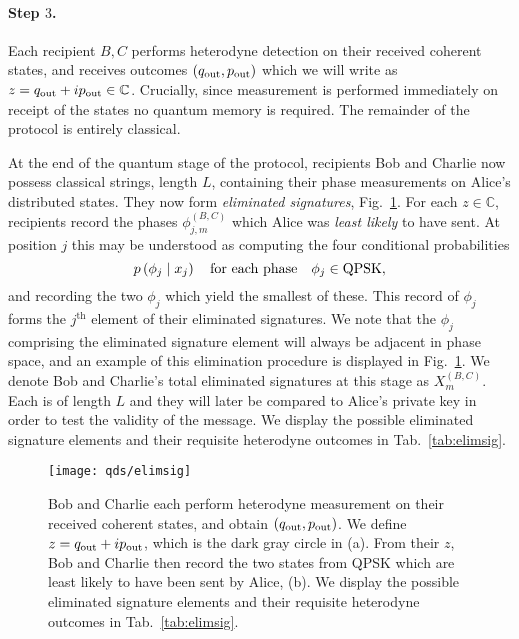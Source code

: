 \paragraph{Step $3$.}
Each recipient $B, C$ performs heterodyne detection on their received coherent states, and receives outcomes $\left( q_{\text{out}}, p_{\text{out}} \right)$ which we will write as $z = q_{\text{out}} + i p_{\text{out}} \in \mathbb{C}$. Crucially, since measurement is performed immediately on receipt of the states no quantum memory is required. The remainder of the protocol is entirely classical.


At the end of the quantum stage of the protocol, recipients Bob and Charlie now possess classical strings, length $L$, containing their phase measurements on Alice's distributed states. They now form \emph{eliminated signatures}, Fig.~\ref{fig:elimsig}. For each $z \in\mathbb{C}$, recipients record the phases $\phi_{j, m}^{\left(B, C\right)}$ which Alice was \emph{least likely} to have sent. At position $j$ this may be understood as computing the four conditional probabilities 
\begin{equation}
p\left(\phi_j \given x_j\right) \qq{for each phase} \phi_j \in \text{QPSK},
\end{equation}
and recording the two $\phi_j$ which yield the smallest of these. This record of $\phi_j$ forms the $j^{\text{th}}$ element of their eliminated signatures. We note that the $\phi_j$ comprising the eliminated signature element will always be adjacent in phase space, and an example of this elimination procedure is displayed in Fig.~\ref{fig:elimsig}. We denote Bob and Charlie's total eliminated signatures at this stage as $X_m^{\left(B, C\right)}$. Each is of length $L$ and they will later be compared to Alice's private key in order to test the validity of the message. We display the possible eliminated signature elements and their requisite heterodyne outcomes in Tab.~\ref{tab:elimsig}.

\begin{figure}[htp]
\captionsetup{width=0.8\linewidth}
\centering
\texttt{[image: qds/elimsig]}
\caption{\label{fig:elimsig} Bob and Charlie each perform heterodyne measurement on their received coherent states, and obtain $\left(q_{\text{out}}, p_{\text{out}}\right)$. We define $z = q_{\text{out}} + i p_{\text{out}}$, which is the dark gray circle in (a). From their $z$, Bob and Charlie then record the two states from QPSK which are least likely to have been sent by Alice, (b). We display the possible eliminated signature elements and their requisite heterodyne outcomes in Tab.~\ref{tab:elimsig}.}
\end{figure}


